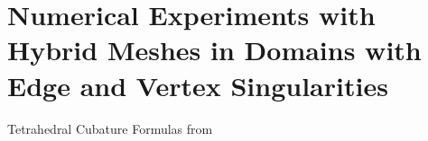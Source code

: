 \section{Numerical Experiments with Hybrid Meshes in Domains with Edge and
Vertex Singularities}

Tetrahedral Cubature Formulas from~\cite{gellertHarbord}
